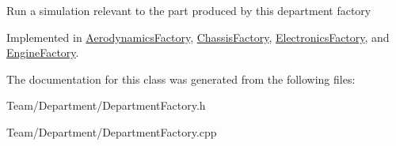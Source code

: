 Run a simulation relevant to the part produced by this department factory 

Implemented in \hyperlink{classAerodynamicsFactory_ab8da5b4d88a649174376d08d17503d30}{Aerodynamics\+Factory}, \hyperlink{classChassisFactory_a80d7b3f0cb610967088f6ed89a71b2bb}{Chassis\+Factory}, \hyperlink{classElectronicsFactory_a5e3355480264038e7ec81b83bd73353a}{Electronics\+Factory}, and \hyperlink{classEngineFactory_abcc2b59253cefc7f902a47b19273cf76}{Engine\+Factory}.



The documentation for this class was generated from the following files\+:\begin{DoxyCompactItemize}
\item 
Team/\+Department/Department\+Factory.\+h\item 
Team/\+Department/Department\+Factory.\+cpp\end{DoxyCompactItemize}
